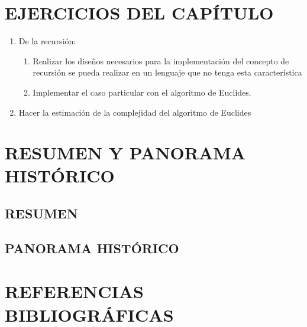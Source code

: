 
\section{EJERCICIOS DEL CAPÍTULO}
\begin{enumerate}
    \item De la recursión:
        \begin{enumerate}
            \item Realizar los diseños necesarios para la implementación del concepto de recursión se pueda realizar en un lenguaje que no tenga esta característica
            \item Implementar el caso particular con el algoritmo de Euclides.
        \end{enumerate}
    \item Hacer la  estimación de la complejidad del algoritmo de Euclides
\end{enumerate}
\section{RESUMEN Y PANORAMA HISTÓRICO}
\subsection{RESUMEN}
\subsection{PANORAMA HISTÓRICO}
\section{REFERENCIAS BIBLIOGRÁFICAS}